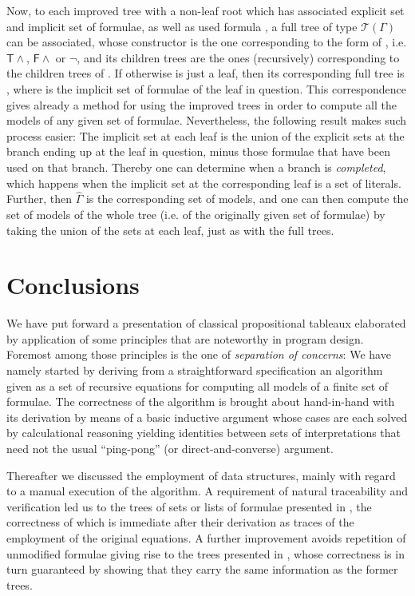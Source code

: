 \documentclass[a4paper,UKenglish]{lipics}
\newcounter{c}
\newcommand{\lmods}[1]{\ensuremath{\hat{#1}}}
\newcommand{\ruleq}[1]{\ensuremath{\mathsf{#1}}}
\newcommand{\ttabl}[1]{\ensuremath{\mathcal{T}({#1})}}
\begin{document}
Now, to each improved tree  with a non-leaf root which has associated explicit set  and implicit set  of formulae, as well as used formula , a full tree of type \ttabl{\Gamma} can be associated, whose constructor is the one corresponding to the form of , i.e. \ruleq{T\wedge}, \ruleq{F\wedge} or \ruleq{\neg}, and its children trees are the ones (recursively) corresponding to the children trees of .
If otherwise  is just a leaf, then its corresponding full tree is , where  is the implicit set of formulae of the leaf in question.
This correspondence gives already a method for using the improved trees in order to compute all the models of any given set of formulae. Nevertheless, the following result makes such process easier:
The implicit set at each leaf is the union of the explicit sets at the branch ending up at the leaf in question, minus those formulae that have been used on that branch.
Thereby one can determine when a branch is \emph{completed}, which happens when the implicit set at the corresponding leaf is a set  of literals. Further, then \lmods{\Gamma} is the corresponding set of models, and one can then compute the set of models of the whole tree (i.e. of the originally given set of formulae) by taking the union of the sets at each leaf, just as with the full trees.

\section{Conclusions}
We have put forward a presentation of classical propositional tableaux elaborated by application of some principles that are noteworthy in program design. Foremost among those principles is the one of \emph{separation of concerns}: We have namely started by deriving from a straightforward specification an algorithm given as a set of recursive equations for computing all models of a finite set of formulae. The correctness of the algorithm is brought about hand-in-hand with its derivation by means of a basic inductive argument whose cases are each solved by calculational reasoning yielding identities between sets of interpretations that need not the usual ``ping-pong'' (or direct-and-converse) argument.

Thereafter we discussed the employment of data structures, mainly with regard to a manual execution of the algorithm. A requirement of natural traceability and verification led us to the trees of sets or lists of formulae presented in \cite{Hintikka,Ben-Ari}, the correctness of which is immediate after their derivation as traces of the employment of the original equations. A further improvement avoids repetition of unmodified formulae giving rise to the trees presented in \cite{Smullyan}, whose correctness is in turn guaranteed by showing that they carry the same information as the former trees.
\end{document}

